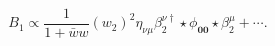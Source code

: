 \begin{equation}
B_{1}\propto \frac{1}{1+\bar{w}w}(w_{2})^{2}\eta _{\nu \mu }\beta _{2}^{\nu
\dagger }\star \phi _{\mathbf{00}}\star \beta _{2}^{\mu }+\cdots .
\end{equation}%
